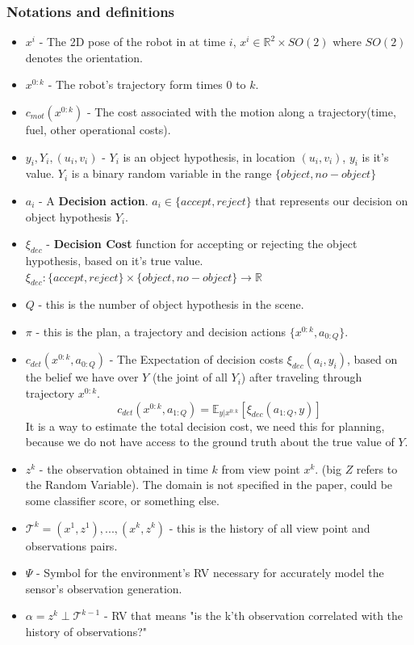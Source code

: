 \documentclass{article}
\begin{document}
	\subsubsection{Notations and definitions}
	\begin{itemize}
		\item $x^i$ - The 2D pose of the robot in at time $i$,
		$x^i \in \mathbb{R}^2 \times SO(2)$ where $SO(2)$ denotes the orientation.
		\item $x^{0:k}$ - The robot's trajectory form times $0$ to $k$.
		\item $c_{mot}(x^{0:k})$ - The cost associated with the motion along a trajectory(time, fuel, other operational costs).
		\item $y_i, Y_i, (u_i, v_i)$ - $Y_i$ is an object hypothesis, in location $(u_i, v_i)$,
		$y_i$ is it's value. $Y_i$ is a binary random variable in the range $\{object,no-object\}$
		\item $a_i$ - A \textbf{Decision action}. $a_i\in\{accept,reject\}$ that represents our decision on object hypothesis $Y_i$. 
		\item $\xi_{dec}$ - \textbf{Decision Cost} function for accepting or rejecting the object hypothesis, based on it's true value.
		$\xi_{dec} : \{accept,reject\}\times\{object,no-object\}\rightarrow\mathbb{R}$ 
		\item $Q$ - this is the number of object hypothesis in the scene.
		\item $\pi$ - this is the plan, a trajectory and decision actions $\{x^{0:k},a_{0:Q}\}$.
		\item $c_{det}(x^{0:k},a_{0:Q})$ - The Expectation of decision costs $\xi_{dec}(a_i,y_i)$, based on the belief we have over $Y$ (the joint of all $Y_i$) after traveling through trajectory $x^{0:k}$.
		\begin{equation}
		c_{det}(x^{0:k},a_{1:Q})=\mathbb{E}_{y|x^{0:k}}[\xi_{dec}(a_{1:Q},y)]
		\end{equation}  
		It is a way to estimate the total decision cost, we need this for planning, because we do not have access to the ground truth about the true value of $Y$.
		\item $z^k$ - the observation obtained in time $k$ from view point $x^k$. (big $Z$ refers to the Random Variable). The domain is not specified in the paper, could be some classifier score, or something else.
		\item $\mathcal{T}^k = {(x^1,z^1),...,(x^k,z^k)}$ - this is the history of all view point and observations pairs.
		\item $\Psi$ - Symbol for the environment's RV necessary for accurately model the sensor's observation generation.
		\item $\alpha = z^k \perp \mathcal{T}^{k-1}$ - RV that means "is the k'th observation correlated with the history of observations?"
	\end{itemize}
\end{document}
